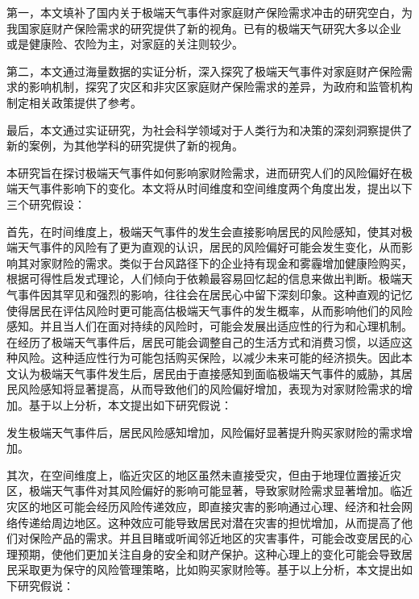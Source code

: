 第一，本文填补了国内关于极端天气事件对家庭财产保险需求冲击的研究空白，为我国家庭财产保险需求的研究提供了新的视角。已有的极端天气研究大多以企业 \citep{0Do}或是健康险\citep{赵强2021空气污染对商业健康保险需求的影响}、农险\citep{胡新艳2021气候变化}为主，对家庭的关注则较少。

第二，本文通过海量数据的实证分析，深入探究了极端天气事件对家庭财产保险需求的影响机制，探究了灾区和非灾区家庭财产保险需求的差异，为政府和监管机构制定相关政策提供了参考。

最后，本文通过实证研究，为社会科学领域对于人类行为和决策的深刻洞察提供了新的案例，为其他学科的研究提供了新的视角。

本研究旨在探讨极端天气事件如何影响家财险需求，进而研究人们的风险偏好在极端天气事件影响下的变化。本文将从时间维度和空间维度两个角度出发，提出以下三个研究假设：

首先，在时间维度上，极端天气事件的发生会直接影响居民的风险感知，使其对极端天气事件的风险有了更为直观的认识，居民的风险偏好可能会发生变化，从而影响其对家财险的需求。类似于台风路径下的企业持有现金\citep{0Do}和雾霾增加健康险购买\citep{赵强2021空气污染对商业健康保险需求的影响}，根据可得性启发式理论\citep{tversky1973availability}，人们倾向于依赖最容易回忆起的信息来做出判断。极端天气事件因其罕见和强烈的影响，往往会在居民心中留下深刻印象。这种直观的记忆使得居民在评估风险时更可能高估极端天气事件的发生概率，从而影响他们的风险感知。并且当人们在面对持续的风险时，可能会发展出适应性的行为和心理机制\citep{gigerenzer2011heuristic}。在经历了极端天气事件后，居民可能会调整自己的生活方式和消费习惯，以适应这种风险。这种适应性行为可能包括购买保险，以减少未来可能的经济损失。因此本文认为极端天气事件发生后，居民由于直接感知到面临极端天气事件的威胁，其居民风险感知将显著提高，从而导致他们的风险偏好增加，表现为对家财险需求的增加。基于以上分析，本文提出如下研究假说：

\begin{hyp} \label{hyp:1}
    发生极端天气事件后，居民风险感知增加，风险偏好显著提升购买家财险的需求增加。
\end{hyp}

其次，在空间维度上，临近灾区的地区虽然未直接受灾，但由于地理位置接近灾区，极端天气事件对其风险偏好的影响可能显著\citep{0Do}，导致家财险需求显著增加。临近灾区的地区可能会经历风险传递效应，即直接灾害的影响通过心理、经济和社会网络传递给周边地区。这种效应可能导致居民对潜在灾害的担忧增加，从而提高了他们对保险产品的需求。并且目睹或听闻邻近地区的灾害事件，可能会改变居民的心理预期，使他们更加关注自身的安全和财产保护。这种心理上的变化可能会导致居民采取更为保守的风险管理策略，比如购买家财险等。基于以上分析，本文提出如下研究假说：

